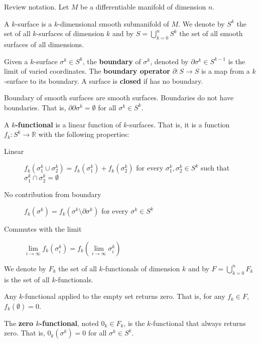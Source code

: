 Review notation. Let $M$ be a differentiable manifold of dimension $n$.

\begin{defn}
	A $k$-surface is a $k$-dimensional smooth submanifold of $M$. We denote by $S^k$ the set of all  $k$-surfaces of dimension $k$ and by $S = \bigcup_{k=0}^n S^k$ the set of all smooth surfaces of all dimensions.
\end{defn}

\begin{defn}
	Given a $k$-surface $\sigma^k \in S^k$, the \textbf{boundary} of $\sigma^k$, denoted by $\partial\sigma^k \in S^{k-1}$ is the limit of varied coordinates. The \textbf{boundary operator} $\partial : S \to S$ is a map from a $k$-surface to its boundary. A surface is \textbf{closed} if has no boundary.
\end{defn}

\begin{coro}
	Boundary of smooth surfaces are smooth surfaces. Boundaries do not have boundaries. That is, $\partial\partial \sigma^k = \emptyset$ for all $\sigma^k \in S^k$.
\end{coro}


\begin{defn}
	A \textbf{$k$-functional} is a linear function of $k$-surfaces. That is, it is a function $f_k : S^k \to \mathbb{R}$ with the following properties:
	\begin{description}
		\item[Linear] $f_k(\sigma^k_1 \cup \sigma^k_2) = f_k(\sigma^k_1) + f_k(\sigma^k_2)$ for every $\sigma^k_1, \sigma^k_2 \in S^k$ such that $\sigma^k_1 \cap \sigma^k_2 = \emptyset$
		\item[No contribution from boundary] $f_k(\sigma^k) = f_k(\sigma^k \setminus \partial \sigma^k)$ for every $\sigma^k \in S^k$
		\item[Commutes with the limit] $\lim\limits_{i \to \infty} f_k(\sigma_i^k) = f_k(\lim\limits_{i \to \infty}\sigma_i^k)$
	\end{description}
	We denote by $F_k$ the set of all $k$-functionals of dimension $k$ and by $F = \bigcup_{k=0}^nF_k$ is the set of all $k$-functionals.
\end{defn}

\begin{coro}
	Any $k$-functional applied to the empty set returns zero. That is, for any $f_k \in F$, $f_k(\emptyset) = 0$.
\end{coro}

\begin{defn}
	The \textbf{zero $k$-functional}, noted $0_k \in F_k$, is the $k$-functional that always returns zero. That is, $0_k(\sigma^k) = 0$ for all $\sigma^k \in S^k$.
\end{defn}


